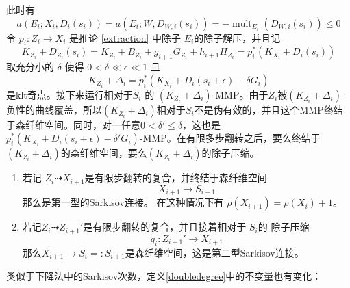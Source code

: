\begin{enumerate}
  此时有
  \[ a(E_{i};X_{i},D_{i}(s_{i}))= a(E_{i};W,D_{W,i}(s_{i}))=-\operatorname{mult}_{E_{i}}(D_{W,i}(s_{i}))\leqslant 0 \]
  令 $p_{i}:Z_{i}\to X_{i}$ 是推论 \ref{extraction} 中除子 $E_{i}$的除子解压，并且记
  \[K_{Z_{i}}+D_{Z_{i}}(s_{i})=K_{Z_{i}}+B_{Z_{i}}+g_{i+1}G_{Z_{i}}+h_{i+1}H_{Z_{i}}=p_{i}^*\left(K_{X_{i}}+D_{i}\left(s_{i}\right)\right)\]
  取充分小的 $\delta$ 使得 $0<\delta \ll \epsilon \ll 1$ 且
  \[ K_{Z_{i}}+\Delta_{i}=p_{i}^*(K_{X_{i}}+D_{i}(s_{i}+\epsilon)-\delta G_{i}) \]
  是klt奇点。接下来运行相对于$S_{i}$ 的 $(K_{Z_{i}}+\Delta_{i})$-MMP。由于$Z_{i}$被$(K_{Z_{i}}+\Delta_{i})$-负性的曲线覆盖，所以$(K_{Z_{i}}+\Delta_{i})$相对于$S_{i}$不是伪有效的，并且这个MMP终结于森纤维空间。同时，对一任意$0<\delta'\leqslant\delta$，这也是$p_{i}^*(K_{X_{i}}+D_{i}(s_{i}+\epsilon)-\delta'G_{i})$-MMP。在有限多步翻转之后，要么终结于$(K_{Z_{i}}+\Delta_{i})$的森纤维空间，要么$(K_{Z_{i}}+\Delta_{i})$的除子压缩。
  \begin{enumerate}
    \item 若记 $Z_{i}\dashrightarrow X_{i+1}$是有限步翻转的复合，并终结于森纤维空间
      \[X_{i+1}\to S_{i+1}\]
      那么是第一型的Sarkisov连接。 
      在这种情况下有 $\rho(X_{i+1})=\rho(X_{i})+1$。
    \item 若记$Z_{i}\dashrightarrow Z_{i+1}'$是有限步翻转的复合，并且接着相对于 $S_{i}$的 除子压缩
      \[q_{i}:Z_{i+1}'\to X_{i+1}\]
     那么$X_{i+1}\to S_{i}=:S_{i+1}$是森纤维空间，这是第二型Sarkisov连接。
  \end{enumerate}
\end{enumerate}
类似于下降法中的Sarkisov次数，定义\ref{doubledegree}中的不变量也有变化：
